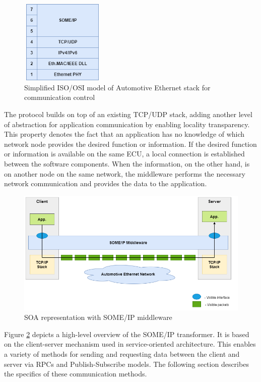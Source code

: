 \begin{figure}[!htb]
	\centering
		\includegraphics[width=4cm, height=4cm,keepaspectratio]{images/iso_osi_someip.png}
	\caption{Simplified ISO/OSI model of Automotive Ethernet stack for communication control}
	\label{fig:ISO_OSI_Model}
\end{figure}

The protocol builds on top of an existing TCP/UDP stack, adding another level of abstraction for application communication by enabling locality transparency. This property denotes the fact that an application has no knowledge of which network node provides the desired function or information. If the desired function or information is available on the same ECU, a local connection is established between the software components\cite{b1.4}. When the information, on the other hand, is on another node on the same network, the middleware performs the necessary network communication and provides the data to the application.

\begin{figure}[!htb]
	\centering
		\includegraphics[width=1\textwidth]{images/SOMEIP_Middleware.png}
	\caption{SOA representation with SOME/IP middleware}
	\label{fig:SOMEIP_Middleware}
\end{figure}

Figure \ref{fig:SOMEIP_Middleware} depicts a high-level overview of the SOME/IP transformer. It is based on the client-server mechanism used in service-oriented architecture. This enables a variety of methods for sending and requesting data between the client and server via RPCs and Publish-Subscribe models. The following section describes the specifics of these communication methods.

